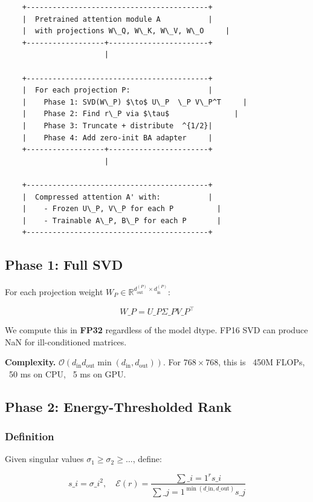 \begin{lstlisting}
    +------------------------------------------+
    |  Pretrained attention module A           |
    |  with projections W\_Q, W\_K, W\_V, W\_O     |
    +------------------+-----------------------+
                       |
                        
    +------------------------------------------+
    |  For each projection P:                  |
    |    Phase 1: SVD(W\_P) $\to$ U\_P  \_P V\_P^T     |
    |    Phase 2: Find r\_P via $\tau$               |
    |    Phase 3: Truncate + distribute  ^{1/2}|
    |    Phase 4: Add zero-init BA adapter     |
    +------------------+-----------------------+
                       |
                        
    +------------------------------------------+
    |  Compressed attention A' with:           |
    |    - Frozen U\_P, V\_P for each P          |
    |    - Trainable A\_P, B\_P for each P       |
    +------------------------------------------+
\end{lstlisting}

\subsection{Phase 1: Full SVD}

For each projection weight $W_P \in \mathbb{R}^{d_\text{out}^{(P)} \times d_\text{in}^{(P)}}$:

\[
W\_P = U\_P \Sigma\_P V\_P^\top
\tag{4.1}
\]

We compute this in \textbf{FP32} regardless of the model dtype. FP16 SVD can 
produce NaN for ill-conditioned matrices.

\textbf{Complexity.} $\mathcal{O}(d_\text{in} d_\text{out} \min(d_\text{in}, d_\text{out}))$. 
For $768 \times 768$, this is ~450M FLOPs, ~50 ms on CPU, ~5 ms on GPU.

\subsection{Phase 2: Energy-Thresholded Rank}

\subsubsection{Definition}

Given singular values $\sigma_1 \geq \sigma_2 \geq \dots$, define:

\[
s\_i = \sigma\_i^2, \quad \mathcal{E}(r) = \frac{\sum\_{i=1}^{r} s\_i}{\sum\_{j=1}^{\min(d\_\text{in}, d\_\text{out})} s\_j}
\tag{4.2}
\]

